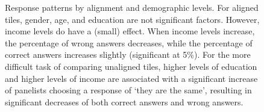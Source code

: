 \documentclass[
]{jds}
\begin{document}
\begin{figure}

\begin{minipage}[t]{\linewidth}

{\centering 


}

\end{minipage}%
\newline
\begin{minipage}[t]{\linewidth}

{\centering 


}

\end{minipage}%

\caption{\label{fig-demographics}Response patterns by alignment and
demographic levels. For aligned tiles, gender, age, and education are
not significant factors. However, income levels do have a (small)
effect. When income levels increase, the percentage of wrong answers
decreases, while the percentage of correct answers increases slightly
(significant at 5\%). For the more difficult task of comparing unaligned
tiles, higher levels of education and higher levels of income are
associated with a significant increase of panelists choosing a response
of `they are the same', resulting in significant decreases of both
correct answers and wrong answers.}

\end{figure}
\end{document}
